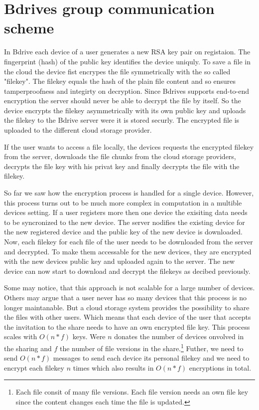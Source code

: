 \section{Bdrives group communication scheme}

In Bdrive each device of a user generates a new RSA key pair on registaion. The fingerprint (hash) of the public key identifies the device uniquly. To save a file in the cloud the device fist encrypes the file symmetrically with the so called "filekey". The filekey equals the hash of the plain file content and so ensures tamperproofness and integirty on decryption. Since Bdrives supports end-to-end encryption the server should never be able to decrypt the file by itself. So the device encrypts the filekey asymmetrically with its own public key and uploads the filekey to the Bdrive server were it is stored securly. The encrypted file is uploaded to the different cloud storage provider. 

If the user wants to access a file locally, the devices requests the encrypted filekey from the server, downloads the file chunks from the cloud storage providers, decrypts the file key with his privat key and finally decrypts the file with the filekey. 

So far we saw how the encryption process is handled for a single device. However, this process turns out to be much more complex in computation in a multible devices setting.  If a user registers more then one device the exisiting data needs to be syncronized to the new device. The server nodifies the existing device for the new registered device and the public key of the new device is downloaded. Now, each filekey for each file of the user needs to be downloaded from the server and decrypted. To make them accessable for the new devices, they are encrypted with the new devices public key and uploaded again to the server. The new device can now start to download and decrypt the filekeys as decibed previously. 

Some may notice, that this approach is not scalable for a large number of devices. Others may argue that a user never has so many devices that this process is no longer maintanable. But a cloud storage system provides the possibility to share the files with other users. Which means that each device of the user that accepts the invitation to the share needs to have an own encrypted file key. This process scales with $O(n * f)$ keys. Were $n$ donates the number of devices onvolved in the sharing and $f$ the number of file versions in the share.\footnote{Each file consit of many file versions. Each file version needs an own file key since the content changes each time the file is updated.} Futher, we need to send $O(n * f)$ messages to send each device its personal filekey and we need to encrypt each filekey $n$ times which also results in $O(n * f)$ encryptions in total. 

